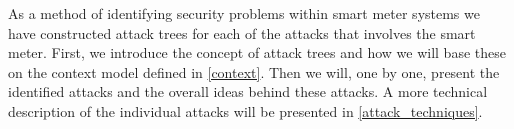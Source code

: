 
As a method of identifying security problems within smart meter systems we have constructed attack trees for each of the attacks that involves the smart meter.
First, we introduce the concept of attack trees and how we will base these on the context model defined in \cref{context}.
Then we will, one by one, present the identified attacks and the overall ideas behind these attacks.
A more technical description of the individual attacks will be presented in \cref{attack_techniques}.
